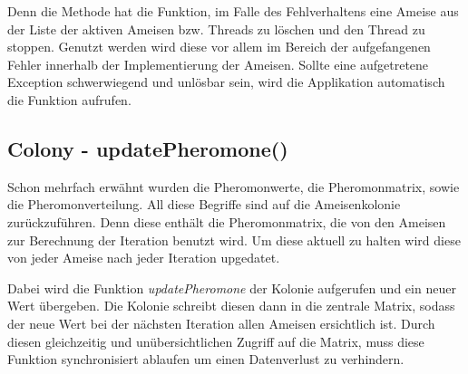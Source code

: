 {	Denn die Methode hat die Funktion, im Falle des Fehlverhaltens eine Ameise aus der Liste der aktiven Ameisen bzw. Threads zu löschen und den Thread zu stoppen.
	Genutzt werden wird diese vor allem im Bereich der aufgefangenen Fehler innerhalb der Implementierung der Ameisen. Sollte eine aufgetretene Exception schwerwiegend und unlösbar sein, wird die Applikation automatisch die Funktion aufrufen.
	
	\subsection{Colony - updatePheromone()}
	Schon mehrfach erwähnt wurden die Pheromonwerte, die Pheromonmatrix, sowie die Pheromonverteilung. All diese Begriffe sind auf die Ameisenkolonie zurückzuführen. Denn diese enthält die Pheromonmatrix, die von den Ameisen zur Berechnung der Iteration benutzt wird. Um diese aktuell zu halten wird diese von jeder Ameise nach jeder Iteration upgedatet. 
	
	Dabei wird die Funktion \textit{updatePheromone} der Kolonie aufgerufen und ein neuer Wert übergeben. Die Kolonie schreibt diesen dann in die zentrale Matrix, sodass der neue Wert bei der nächsten Iteration allen Ameisen ersichtlich ist. Durch diesen gleichzeitig und unübersichtlichen Zugriff auf die Matrix, muss diese Funktion synchronisiert ablaufen um einen Datenverlust zu verhindern.
	
}